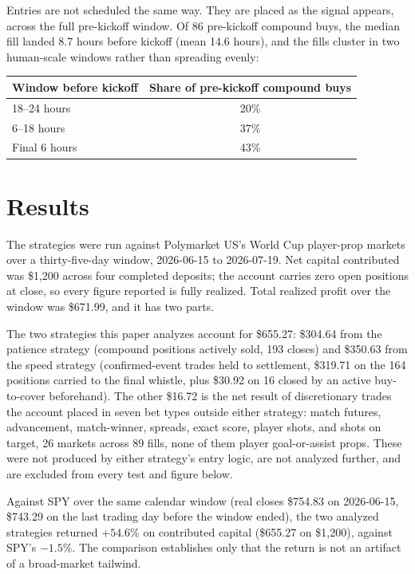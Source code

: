 \documentclass[12pt]{article}
\begin{document}
Entries are not scheduled the same way. They are placed as the signal appears,
across the full pre-kickoff window. Of 86 pre-kickoff compound buys, the median
fill landed 8.7 hours before kickoff (mean 14.6 hours), and the fills cluster in
two human-scale windows rather than spreading evenly:

\begin{center}
\begin{tabular}{@{}l c@{}}
\toprule
Window before kickoff & Share of pre-kickoff compound buys \\
\midrule
18--24 hours & 20\% \\
6--18 hours  & 37\% \\
Final 6 hours & 43\% \\
\bottomrule
\end{tabular}
\end{center}

\section{Results}

The strategies were run against Polymarket US's World Cup player-prop markets over
a thirty-five-day window, 2026-06-15 to 2026-07-19. Net capital contributed was
\$1{,}200 across four completed deposits; the account carries zero open positions
at close, so every figure reported is fully realized. Total realized profit over
the window was \$671.99, and it has two parts.

The two strategies this paper analyzes account for \$655.27: \$304.64 from the
patience strategy (compound positions actively sold, 193 closes) and \$350.63
from the speed strategy (confirmed-event trades held to settlement, \$319.71 on
the 164 positions carried to the final whistle, plus \$30.92 on 16 closed by an
active buy-to-cover beforehand). The other \$16.72 is the net result of
discretionary trades the account placed in seven bet types outside either
strategy: match futures, advancement, match-winner, spreads, exact score, player
shots, and shots on target, 26 markets across 89 fills, none of them player
goal-or-assist props. These were not produced by either strategy's entry logic,
are not analyzed further, and are excluded from every test and figure below.

Against SPY over the same calendar window (real closes \$754.83 on 2026-06-15,
\$743.29 on the last trading day before the window ended), the two analyzed
strategies returned $+54.6\%$ on contributed capital (\$655.27 on \$1{,}200),
against SPY's $-1.5\%$. The comparison establishes only that the return is not an
artifact of a broad-market tailwind.
\end{document}
